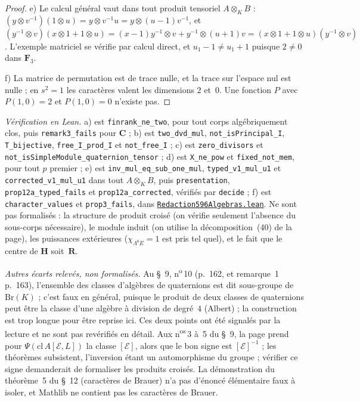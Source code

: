 \begin{proof}
e) Le calcul général vaut dans tout produit tensoriel $A \otimes_K B$ : $(y \otimes v^{-1})(1 \otimes u) = y \otimes v^{-1}u = y \otimes (u-1)v^{-1}$, et $(y^{-1} \otimes v)(x \otimes 1 + 1 \otimes u) = (x-1)y^{-1} \otimes v + y^{-1} \otimes (u+1)v = (x \otimes 1 + 1 \otimes u)(y^{-1} \otimes v)$. L'exemple matriciel se vérifie par calcul direct, et $u_1 - 1 \neq u_1 + 1$ puisque $2 \neq 0$ dans $\mathbf F_3$.

f) La matrice de permutation est de trace nulle, et la trace sur l'espace nul est nulle ; en $s^2 = 1$ les caractères valent les dimensions $2$ et~$0$. Une fonction $P$ avec $P(1, 0) = 2$ et $P(1, 0) = 0$ n'existe pas.
\end{proof}

\begin{sloppypar}
\noindent\emph{Vérification en Lean.} a) est \texttt{finrank\_ne\_two}, pour tout corps algébriquement clos, puis \texttt{remark3\_fails} pour $\mathbf C$ ; b) est \texttt{two\_dvd\_mul}, \texttt{not\_isPrincipal\_I}, \texttt{T\_bijective}, \texttt{free\_I\_prod\_I} et \texttt{not\_free\_I} ; c) est \texttt{zero\_divisors} et \texttt{not\_isSimpleModule\_quaternion\_tensor} ; d) est \texttt{X\_ne\_pow} et \texttt{fixed\_not\_mem}, pour tout $p$ premier ; e) est \texttt{inv\_mul\_eq\_sub\_one\_mul}, \texttt{typed\_v1\_mul\_u1} et \texttt{corrected\_v1\_mul\_u1} dans tout $A \otimes_K B$, puis \texttt{presentation}, \texttt{prop12a\_typed\_fails} et \texttt{prop12a\_corrected}, vérifiés par \texttt{decide} ; f) est \texttt{character\_values} et \texttt{prop3\_fails}, dans \href{\leanblobmain/Redaction596Algebras.lean}{\texttt{Redaction596\allowbreak{}Algebras.\allowbreak{}lean}}. Ne sont pas formalisés : la structure de produit croisé (on vérifie seulement l'absence du sous-corps nécessaire), le module induit (on utilise la décomposition~(40) de la page), les puissances extérieures ($\chi_{\Lambda^0 E} = 1$ est pris tel quel), et le fait que le centre de $\mathbf H$ soit~$\mathbf R$.
\end{sloppypar}

\emph{Autres écarts relevés, non formalisés.} Au §~9, n\textsuperscript{o}\,10 (p.~162, et remarque~1 p.~163), l'ensemble des classes d'algèbres de quaternions est dit sous-groupe de $\mathrm{Br}(K)$ ; c'est faux en général, puisque le produit de deux classes de quaternions peut être la classe d'une algèbre à division de degré~$4$ (Albert) ; la construction est trop longue pour être reprise ici. Ces deux points ont été signalés par la lecture et ne sont pas revérifiés en détail. Aux n\textsuperscript{os}\,3 à~5 du §~9, la page prend pour $\Psi(\mathrm{cl}\,A[\mathcal E, L])$ la classe $[\mathcal E]$, alors que le bon signe est $[\mathcal E]^{-1}$ ; les théorèmes subsistent, l'inversion étant un automorphisme du groupe ; vérifier ce signe demanderait de formaliser les produits croisés. La démonstration du théorème~5 du §~12 (caractères de Brauer) n'a pas d'énoncé élémentaire faux à isoler, et Mathlib ne contient pas les caractères de Brauer.

